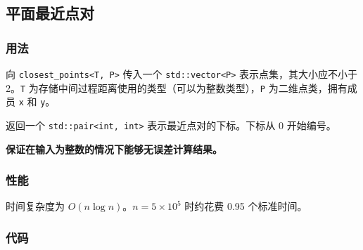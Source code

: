 \subsection{平面最近点对}

\subsubsection{用法}

向 \lstinline{closest_points<T, P>} 传入一个 \lstinline{std::vector<P>} 表示点集，其大小应不小于 2。\lstinline{T} 为存储中间过程距离使用的类型（可以为整数类型），\lstinline{P} 为二维点类，拥有成员 \lstinline{x} 和 \lstinline{y}。

返回一个 \lstinline{std::pair<int, int>} 表示最近点对的下标。下标从 0 开始编号。

\textbf{保证在输入为整数的情况下能够无误差计算结果。}

\subsubsection{性能}

时间复杂度为 $O(n \log n)$。$n = 5 \times 10^5$ 时约花费 0.95 个标准时间。

\subsubsection{代码}


